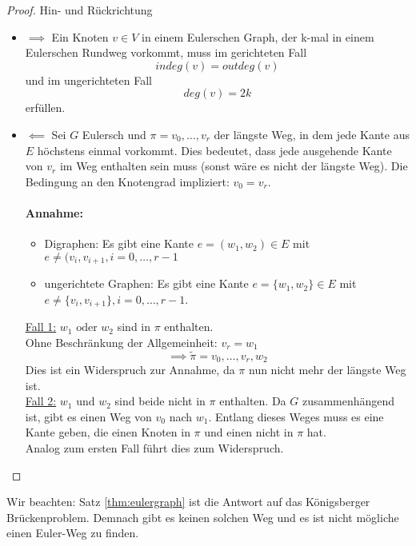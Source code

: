 \begin{proof}
Hin- und Rückrichtung
\begin{itemize}
	\item \underline{$\implies$} Ein Knoten $v \in  V$ in einem Eulerschen Graph, der k-mal in einem Eulerschen Rundweg vorkommt, muss im gerichteten Fall
		\[
		indeg(v) =outdeg(v)
		\]
und im ungerichteten Fall
\[
deg(v)=2k
\]
erfüllen.
\item \underline{$\impliedby$} Sei $G$ Eulersch und $\pi=v_0,\ldots,v_r$ der längste Weg, in dem jede Kante aus $E$ höchstens einmal vorkommt.
Dies bedeutet, dass jede ausgehende Kante von $v_r$ im Weg enthalten sein muss (sonst wäre es nicht der längste Weg).
Die Bedingung an den Knotengrad impliziert: $v_0=v_r$.
\paragraph{Annahme:}
\begin{itemize}
	\item Digraphen: Es gibt eine Kante $e=(w_1,w_2) \in  E $ mit $e \neq (v_i, v_{i+1}, i=0,\ldots,r-1$
	\item ungerichtete Graphen: Es gibt eine Kante $e=\{w_1,w_2\} \in  E$ mit $e \neq \{v_i,v_{i+1}\}, i=0,\ldots,r-1$.
\end{itemize}
\underline{Fall 1:} $w_1 \text{ oder }w_2$ sind in $\pi$ enthalten. \\
Ohne Beschränkung der Allgemeinheit: $v_r=w_1$
\[
\implies \tilde{\pi} =v_0,\ldots,v_r,w_2
\]
Dies ist ein Widerspruch zur Annahme, da $\pi$ nun nicht mehr der längste Weg ist. \\
\underline{Fall 2:} $w_1$ und $w_2$ sind beide nicht in $\pi$ enthalten.
Da $G$ zusammenhängend ist, gibt es einen Weg von $v_0$ nach $w_1$. Entlang dieses Weges muss es eine Kante geben, die einen Knoten in $\pi$ und einen nicht in $\pi$ hat. \\
Analog zum ersten Fall führt dies zum Widerspruch.
\end{itemize}
\end{proof}
Wir beachten: Satz \ref{thm:eulergraph} ist die Antwort auf das Königsberger Brückenproblem. Demnach gibt es keinen solchen Weg und es ist nicht mögliche einen Euler-Weg zu finden.
